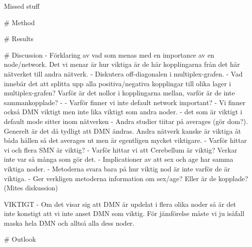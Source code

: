 Missed stuff

# Method


# Results

# Discussion 
    - Förklaring av vad som menas med en importance av en node/network. Det vi menar är hur viktiga är de här kopplingarna från det här nätverket till andra nätverk.
    - Diskutera off-diagonalen i multiplex-grafen.
    - Vad innebär det att splitta upp alla positiva/negativa kopplingar till olika lager i multiplex-grafen? Varför är det nollor i kopplingarna mellan, varför är de inte sammankopplade?
    - 
    - Varför finner vi inte default network important?
        - Vi finner också DMN viktigt men inte lika viktigt som andra noder.
        - det som är viktigt i default mode sitter inom nätverken
        - Andra studier tiitar på averages (gör dom?). Generelt är det då tydligt att DMN ändras. Andra nätverk kanske är viktiga åt båda hållen så det averages ut men är egentligen mycket viktigare. 
    - Varför hittar vi och flera SMN är viktig?
    - Varför hittar vi att Cerebellum är viktig? Verkar inte var så många som gör det. 
    - Implicationer av att sex och age har samma viktiga noder. 
    - Metoderna svara bara på hur viktig nod är inte varför de är viktiga. 
    - Ger verkligen metoderna information om sex/age? Eller är de kopplade? (Mites diskussion)
    
    
    VIKTIGT
    - Om det visar sig att DMN är updelat i flera olika noder så är det inte konstigt att vi inte anset DMN som viktig. För jämförelse måste vi ju isåfall maska hela DMN och alltså alla dess noder.
    
# Outlook